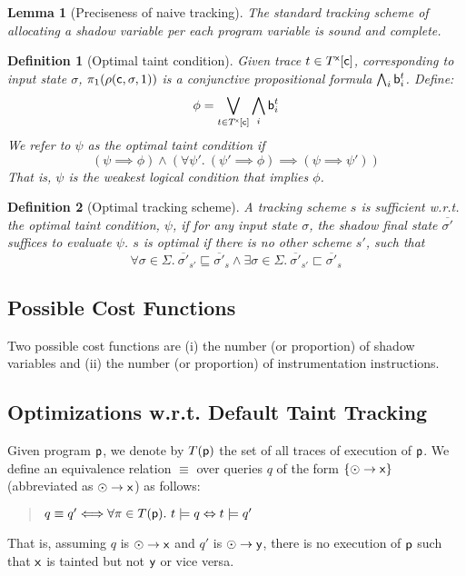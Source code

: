 \documentclass[]{article}
\newtheorem{defn}{Definition}
\newtheorem{lem}{Lemma}
\begin{document}
{\begin{lem}[Preciseness of naive tracking] The standard tracking scheme of allocating a shadow variable per each program variable is sound and complete. 
\end{lem}

\begin{defn}[Optimal taint condition] Given trace $t \in T^{\sf x}[{\sf c}]$,
	corresponding to input state $\sigma$, $\pi_1(\rho({\sf c}, \sigma, 1))$ is
	a conjunctive propositional formula $\bigwedge_i {\sf b}^t_i$. Define:
	$$
		\phi = \bigvee_{t \in T^{\sf x}[{\sf c}]} \bigwedge_i {\sf b}^t_i 
	$$
	We refer to $\psi$ as the \emph{optimal taint condition} if
	$$
	(\psi \implies \phi) \wedge (\forall \psi'.\ (\psi' \implies \phi) \implies (\psi \implies \psi'))
	$$
	That is, $\psi$ is the weakest logical condition that implies $\phi$.
\end{defn}

\begin{defn}[Optimal tracking scheme] A tracking scheme $s$ is \emph{sufficient} w.r.t. the optimal taint condition, $\psi$, if for any input state $\sigma$, the shadow final state $\overline{\sigma'}$ suffices to evaluate $\psi$. $s$ is \emph{optimal} if there is no other scheme $s'$, such that
	$$
	\forall \sigma \in \Sigma.\ \overline{\sigma'}_{s'} \sqsubseteq  \overline{\sigma'}_{s} \wedge \exists \sigma \in \Sigma.\ \overline{\sigma'}_{s'} \sqsubset  \overline{\sigma'}_{s}
	$$
	
\end{defn}

\subsection{Possible Cost Functions}

Two possible cost functions are (i) the number (or proportion) of shadow variables and (ii) the number (or proportion) of instrumentation instructions.

\subsection{Optimizations w.r.t. Default Taint Tracking} 

Given program ${\sf p}$, we denote by $T({\sf p})$ the set of all traces of execution of ${\sf p}$. We define an equivalence relation $\equiv$ over queries $q$ of the form $\{ \odot \rightarrow {\sf x} \}$ (abbreviated as $\odot \rightarrow {\sf x}$) as follows:
\begin{quote}
$q \equiv q'
\Longleftrightarrow \forall \pi \in T({\sf p}).\ t \models q \Leftrightarrow t \models q'$
\end{quote}
That is, assuming $q$ is $\odot \rightarrow {\sf x}$ and $q'$
is $\odot \rightarrow {\sf y}$, there is no execution of ${\sf p}$ such that ${\sf x}$ is tainted but not ${\sf y}$ or vice versa.
 
}
\end{document}
